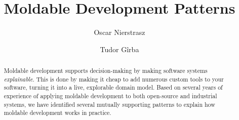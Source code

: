 \documentclass[sigconf]{acmart}
\renewcommand{\nbc}[3]{} %
\newcommand\wc[1]{\nbc{Ward}{#1}{teal}}
\begin{document}
\title[Moldable Development Patterns --- DRAFT]{Moldable Development Patterns}

\author{Oscar Nierstrasz}

\author{Tudor G\^irba}

\renewcommand{\shortauthors}{Nierstrasz and G\^irba} %

\begin{abstract}
Moldable development supports decision-making by making software systems \emph{explainable}.
This is done by making it cheap to add numerous custom tools to your software, turning it into a live, explorable domain model.
Based on several years of experience of applying moldable development to both open-source and industrial systems, we have identified several mutually supporting patterns to explain how moldable development works in practice.
\end{abstract}
\end{document}
